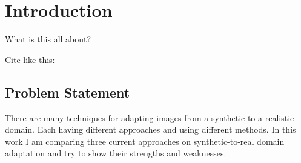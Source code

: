 \chapter{Introduction}
What is this all about?

Cite like this: \cite{NIPS2014_5423}

\section{Problem Statement}
There are many techniques for adapting images from a synthetic to a realistic domain. Each having different approaches and using different methods. In this work I am comparing three current approaches on synthetic-to-real domain adaptation and try to show their strengths and weaknesses.